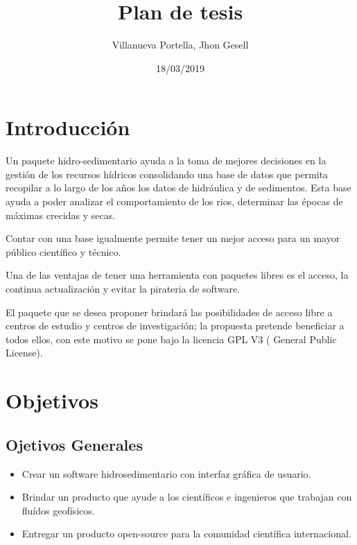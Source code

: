 \documentclass[12pt,a4paper]{report}
\begin{document}
\title{Plan de tesis}
\author{Villanueva Portella, Jhon Gesell}
\date{18/03/2019}
\maketitle

\section{Introducción}
Un paquete hidro-sedimentario ayuda a la toma de mejores decisiones en la gestión de los recursos hídricos consolidando una base de datos que permita recopilar a lo largo de los años los datos de hidráulica y de sedimentos. Esta base ayuda a poder analizar el comportamiento de los rios, determinar las épocas de máximas crecidas y secas.

Contar con una base igualmente permite tener un mejor acceso para un mayor público científico y técnico.

Una de las ventajas de tener una herramienta con paquetes libres es el acceso, la continua actualización y evitar la pirateria de software.



El paquete que se desea proponer brindará las posibilidades de acceso libre a centros de estudio y centros de investigación; la propuesta pretende beneficiar a todos ellos, con este motivo se pone bajo la licencia GPL V3 ( General Public License).
\section{Objetivos}
	\subsection{Ojetivos Generales}
	\begin{itemize}
	\item Crear un software hidrosedimentario con interfaz gráfica de usuario.
	\item Brindar un producto que ayude a los científicos e ingenieros que trabajan con fluídos geofísicos.
	\item Entregar un producto open-source para la comunidad científica internacional.
	\end{itemize}
\end{document}
